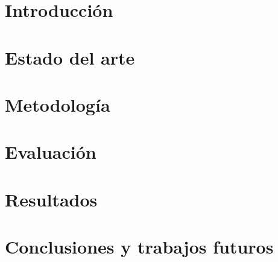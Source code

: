 \documentclass[a4paper]{report}
\newcommand\paginablanco{%
    \null
    \thispagestyle{empty}%
    \newpage}
\begin{document}
\tableofcontents
\newpage
\listoftables %
\newpage
\listoffigures
\newpage

\paginablanco{}

\chapter{Introducción}

\chapter{Estado del arte}

\chapter{Metodología}

\chapter{Evaluación}

\chapter{Resultados}

\chapter{Conclusiones y trabajos futuros}


\newpage


\end{document}
